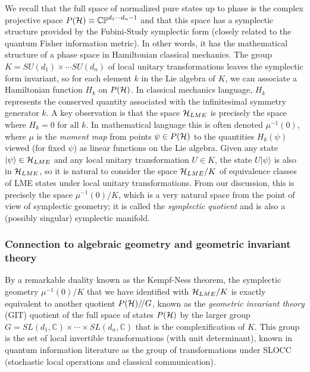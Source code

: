 \documentclass[12pt]{article}
\theoremstyle{definition}
\newcommand{\GITquot}{/\!/}
\begin{document}
We recall that the full space of normalized pure states up
to phase is the complex projective space $P({\cal H}) \equiv
\mathbb{CP}^{d_1 \cdots d_n -1}$ and that this space has a symplectic
structure provided by the Fubini-Study symplectic form (closely
related to the quantum Fisher information metric). In other words, it
has the mathematical structure of a phase space in Hamiltonian
classical mechanics.  The group $K = SU(d_1) \times \cdots SU(d_n)$ of
local unitary transformations leaves the symplectic form invariant, so
for each element $k$ in the Lie algebra of $K$, we can associate a
Hamiltonian function $H_k$ on $P({\cal H})$. In classical mechanics
language, $H_k$ represents the conserved quantity associated with the
infinitesimal symmetry generator $k$. A key observation is that the
space ${\cal H}_{LME}$ is precisely the space where $H_k = 0$ for all
$k$. In mathematical language this is often denoted $\mu^{-1}(0)$,
where $\mu$ is the {\it moment map} from points $\psi \in P({\cal H})$
to the quantities $H_k(\psi)$ viewed (for fixed $\psi$) as linear
functions on the Lie algebra. Given any state $|\psi \rangle \in {\cal
H}_{LME}$ and any local unitary transformation $U \in K$, the state $U
|\psi \rangle$ is also in ${\cal H}_{LME}$, so it is natural to
consider the space ${\cal H}_{LME}/K$ of equivalence classes of LME
states under local unitary transformations. From our discussion, this
is precisely the space $\mu^{-1}(0)/K$, which is a very natural space
from the point of view of symplectic geometry; it is called the
\emph{symplectic quotient} and is also a (possibly singular) symplectic manifold.

\subsubsection{Connection to algebraic geometry and geometric invariant theory}

By a remarkable duality known as the Kempf-Ness theorem, the symplectic geometry $\mu^{-1}(0)/K$ that we have identified with ${\cal H}_{LME}/K$ is exactly equivalent to another quotient $P({\cal H})\GITquot G$, known as the {\it geometric invariant theory} (GIT) quotient of the full space of states $P({\cal H})$ by the larger group $G = SL(d_1, \mathbb{C}) \times \cdots \times SL(d_n, \mathbb{C})$ that is the complexification of $K$. This group is the set of local invertible transformations (with unit determinant), known in quantum information literature as the group of transformations under SLOCC (stochastic local operations and classical communication).
\end{document}
